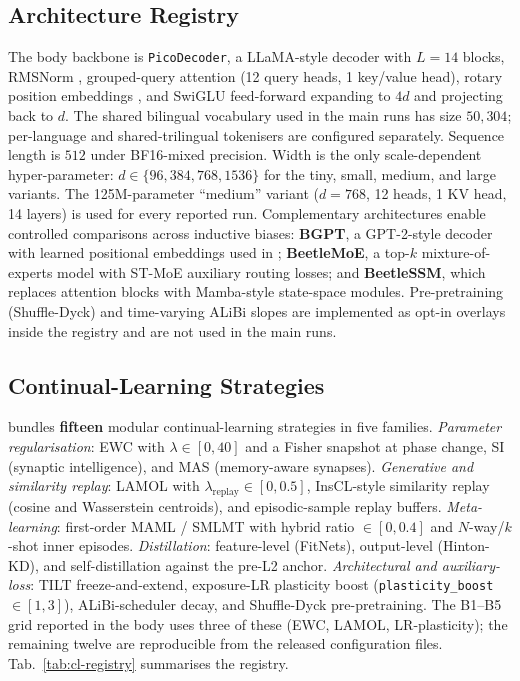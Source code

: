 \subsection{Architecture Registry}\label{sec:beetle-architecture-registry}
 
The body backbone is \texttt{PicoDecoder}, a LLaMA-style \citep{touvron2023llama} decoder with $L=14$ blocks, RMSNorm \citep{zhang2019rms}, grouped-query attention \citep{ainslie2023gqa} (12 query heads, 1 key/value head), rotary position embeddings \citep{su2024rope}, and SwiGLU feed-forward \citep{shazeer2020glu} expanding to $4d$ and projecting back to $d$. The shared bilingual vocabulary used in the main runs has size $50{,}304$; per-language and shared-trilingual tokenisers are configured separately. Sequence length is $512$ under BF16-mixed precision. Width is the only scale-dependent hyper-parameter: $d\in\{96,384,768,1536\}$ for the tiny, small, medium, and large variants. The 125M-parameter ``medium'' variant ($d=768$, 12 heads, 1 KV head, 14 layers) is used for every reported run. Complementary architectures enable controlled comparisons across inductive biases: \textbf{BGPT}, a GPT-2-style decoder with learned positional embeddings used in \citet{arnett-etal-2025-acquisition}; \textbf{BeetleMoE}, a top-$k$ mixture-of-experts model with ST-MoE auxiliary routing losses; and \textbf{BeetleSSM}, which replaces attention blocks with Mamba-style state-space modules. Pre-pretraining (Shuffle-Dyck) and time-varying ALiBi slopes are implemented as opt-in overlays inside the registry and are not used in the main runs.
 
\subsection{Continual-Learning Strategies}\label{sec:cl-strategies}
 
\beetle{} bundles \textbf{fifteen} modular continual-learning strategies in five families. \emph{Parameter regularisation}: EWC \citep{kirkpatrick2017overcoming} with $\lambda\in[0,40]$ and a Fisher snapshot at phase change, SI (synaptic intelligence), and MAS (memory-aware synapses). \emph{Generative and similarity replay}: LAMOL \citep{sun2020lamol} with $\lambda_{\text{replay}}\in[0,0.5]$, InsCL-style similarity replay (cosine and Wasserstein centroids), and episodic-sample replay buffers. \emph{Meta-learning}: first-order MAML / SMLMT \citep{bansal-etal-2020-self,africa-etal-2025-learning,africa-etal-2025-meta} with hybrid ratio $\in[0,0.4]$ and $N$-way/$k$-shot inner episodes. \emph{Distillation}: feature-level (FitNets), output-level (Hinton-KD), and self-distillation against the pre-L2 anchor. \emph{Architectural and auxiliary-loss}: TILT freeze-and-extend, exposure-LR plasticity boost (\texttt{plasticity\_boost}$\in[1,3]$), ALiBi-scheduler decay, and Shuffle-Dyck pre-pretraining. The B1--B5 grid reported in the body uses three of these (EWC, LAMOL, LR-plasticity); the remaining twelve are reproducible from the released configuration files. Tab.~\ref{tab:cl-registry} summarises the registry.
 
